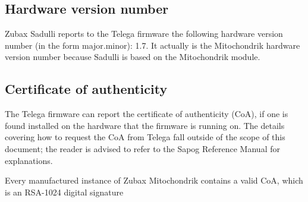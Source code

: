 \documentclass{zubaxdoc}
\begin{document}
\subsection{Hardware version number}

Zubax Sadulli reports to the Telega firmware the following hardware version number
(in the form major.minor): 1.7. It actually is the Mitochondrik hardware version number because Sadulli is based on the Mitochondrik module. 

\subsection{Certificate of authenticity}\label{sec:certificate_of_authenticity}

The Telega firmware can report the certificate of authenticity (CoA),
if one is found installed on the hardware that the firmware is running on.
The details covering how to request the CoA from Telega fall outside of the scope of this document;
the reader is advised to refer to the Sapog Reference Manual for explanations.

Every manufactured instance of Zubax Mitochondrik contains a valid CoA, which is an RSA-1024 digital signature
\end{document}

